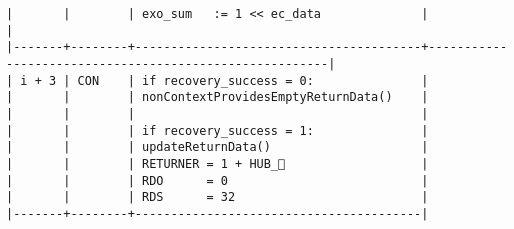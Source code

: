 \documentclass[varwidth=\maxdimen,margin=0.5cm,multi={verbatim}]{standalone}
\begin{document}
\begin{verbatim}
|       |        | exo_sum   := 1 << ec_data              |                                                        |
|-------+--------+----------------------------------------+--------------------------------------------------------|
| i + 3 | CON    | if recovery_success = 0:               |
|       |        | nonContextProvidesEmptyReturnData()    |
|       |        |                                        |
|       |        | if recovery_success = 1:               |
|       |        | updateReturnData()                     |
|       |        | RETURNER = 1 + HUB_                   |
|       |        | RDO      = 0                           |
|       |        | RDS      = 32                          |
|-------+--------+----------------------------------------|
\end{verbatim}
\end{document}
